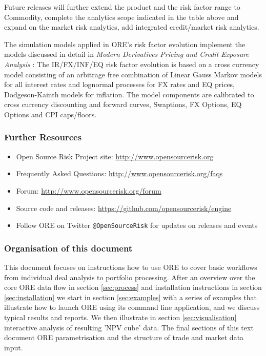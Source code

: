 \documentclass[12pt, a4paper]{article}
\begin{document}
Future releases will further extend the product and the risk factor range to Commodity, complete the analytics scope indicated in the table above and expand on the market risk analytics, add integrated credit/market risk analytics. 

\medskip The simulation models applied in ORE's risk factor evolution implement the models discussed in detail in {\em
  Modern Derivatives Pricing and Credit Exposure Analysis} \cite{Lichters}: The IR/FX/INF/EQ risk factor evolution is based on
a cross currency model consisting of an arbitrage free combination of Linear Gauss Markov models for all interest rates
and lognormal processes for FX rates and EQ prices, Dodgeson-Kainth models for inflation. The model components are calibrated to cross currency discounting and forward curves, Swaptions, FX Options, EQ Options and CPI caps/floors.

\subsubsection*{Further Resources}
\begin{itemize}
\item Open Source Risk Project site: \url{http://www.opensourcerisk.org}
\item Frequently Asked Questions: \url{http://www.opensourcerisk.org/faqs}
\item Forum: \url{http://www.opensourcerisk.org/forum}
\item Source code and releases: \url{https://github.com/opensourcerisk/engine}
\item Follow ORE on Twitter {\tt @OpenSourceRisk} for updates on releases and events
\end{itemize}
 
\subsubsection*{Organisation of this document}

This document focuses on instructions how to use ORE to cover basic workflows from individual deal analysis to portfolio
processing. After an overview over the core ORE data flow in section \ref{sec:process} and installation instructions in
section \ref{sec:installation} we start in section \ref{sec:examples} with a series of examples that illustrate how to
launch ORE using its command line application, and we discuss typical results and reports. We then illustrate in section
\ref{sec:visualisation} interactive analysis of resulting 'NPV cube' data. The final sections of this text document ORE
parametrisation and the structure of trade and market data input.
\end{document}
